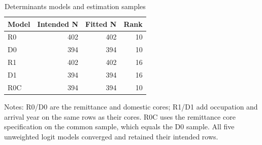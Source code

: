 \begin{table}[tbp]\centering
\caption{Determinants models and estimation samples}\label{tab:det-models}
\begin{tabular}{lrrr}\toprule Model & Intended N & Fitted N & Rank \\
\midrule
R0 & 402 & 402 & 10 \\
D0 & 394 & 394 & 10 \\
R1 & 402 & 402 & 16 \\
D1 & 394 & 394 & 16 \\
R0C & 394 & 394 & 10 \\
\bottomrule\end{tabular}
\par\smallskip\begin{minipage}{0.96\linewidth}\footnotesize\raggedright Notes: R0/D0 are the remittance and domestic cores; R1/D1 add occupation and arrival year on the same rows as their cores. R0C uses the remittance core specification on the common sample, which equals the D0 sample. All five unweighted logit models converged and retained their intended rows. \end{minipage}\end{table}
